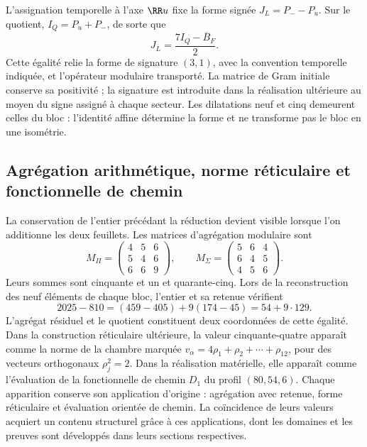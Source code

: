 L’assignation temporelle à l’axe \(\RR u\) fixe la forme signée
\(J_L=P_--P_u\). Sur le quotient, \(I_Q=P_u+P_-\), de sorte que
\[
 J_L=\frac{7I_Q-\overline B_F}{2}.
\]
Cette égalité relie la forme de signature \((3,1)\), avec la
convention temporelle indiquée, et l’opérateur modulaire transporté. La
matrice de Gram initiale conserve sa positivité ; la signature est introduite
dans la réalisation ultérieure au moyen du signe assigné à chaque secteur.
Les dilatations neuf et cinq demeurent celles du bloc : l’identité
affine détermine la forme et ne transforme pas le bloc en une isométrie.

\subsection{Agrégation arithmétique, norme réticulaire et fonctionnelle de chemin}
La conservation de l'entier précédant la réduction devient visible lorsque l'on additionne les deux feuillets. Les matrices d'agrégation modulaire sont
\[
 M_\Pi=\begin{pmatrix}4&5&6\\5&4&6\\6&6&9\end{pmatrix},\qquad
 M_\Sigma=\begin{pmatrix}5&6&4\\6&4&5\\4&5&6\end{pmatrix}.
\]
Leurs sommes sont cinquante et un et quarante-cinq. Lors de la reconstruction des
neuf éléments de chaque bloc, l’entier et sa retenue vérifient
\[
 2025-810=(459-405)+9(174-45)=54+9\cdot129.
\]
L'agrégat résiduel et le quotient constituent deux coordonnées de cette égalité. Dans la construction réticulaire ultérieure, la valeur cinquante-quatre apparaît comme la norme de la chambre marquée \(v_\alpha=4\rho_1+\rho_2+\cdots+\rho_{12}\), pour des vecteurs orthogonaux \(\rho_j^2=2\). Dans la réalisation matérielle, elle apparaît comme l'évaluation de la fonctionnelle de chemin \(D_1\) du profil \((80,54,6)\). Chaque apparition conserve son application d'origine : agrégation avec retenue, forme réticulaire et évaluation orientée de chemin. La coïncidence de leurs valeurs acquiert un contenu structurel grâce à ces applications, dont les domaines et les preuves sont développés dans leurs sections respectives.
